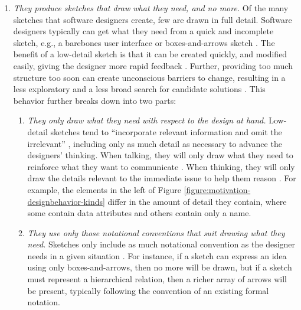 \documentclass[12pt,fleqn]{ucithesis}
\begin{document}
\begin{enumerate}
\item \emph{They produce sketches that draw what they need, and no more.} Of the many sketches that software designers create, few are drawn in full detail. Software designers typically can get what they need from a quick and incomplete sketch, e.g., a barebones user interface or boxes-and-arrows sketch \cite{virzi1996usability}. The benefit of a low-detail sketch is that it can be created quickly, and modified easily, giving the designer more rapid feedback \cite{cherubini2007let,petre2009insights}. Further, providing too much structure too soon can create unconscious barriers to change, resulting in a less exploratory and a less broad search for candidate solutions \citep{wong1992rough}. This behavior further breaks down into two parts:
 \begin{enumerate}
 \item \emph{They only draw what they need with respect to the design at hand.} Low-detail sketches tend to “incorporate relevant information and omit the irrelevant” \cite{tversky2002sketches}, including only as much detail as necessary to advance the designers' thinking. When talking, they will only draw what they need to reinforce what they want to communicate \cite{petre2009insights}. When thinking, they will only draw the details relevant to the immediate issue to help them reason \citep{dekel2007notation}. For example, the elements in the left of Figure \ref{figure:motivation-designbehavior-kinds} differ in the amount of detail they contain, where some contain data attributes and others contain only a name.
 \item \emph{They use only those notational conventions that suit drawing what they need.} Sketches only include as much notational convention as the designer needs in a given situation \cite{petre2009insights}. For instance, if a sketch can express an idea using only boxes-and-arrows, then no more will be drawn, but if a sketch must represent a hierarchical relation, then a richer array of arrows will be present, typically following the convention of an existing formal notation.
 \end{enumerate}


\end{enumerate}
\end{document}
